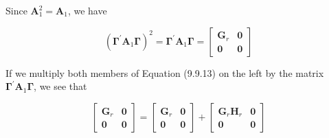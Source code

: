 Since $\boldsymbol{A}_{1}^{2}=\boldsymbol{A}_{1}$, we have

$$
\left(\boldsymbol{\Gamma}^{\prime} \boldsymbol{A}_{1} \boldsymbol{\Gamma}\right)^{2}=\boldsymbol{\Gamma}^{\prime} \boldsymbol{A}_{1} \boldsymbol{\Gamma}=\left[\begin{array}{cc}
\boldsymbol{G}_{r} & \mathbf{0} \\
\mathbf{0} & \mathbf{0}
\end{array}\right]
$$

If we multiply both members of Equation (9.9.13) on the left by the matrix $\boldsymbol{\Gamma}^{\prime} \boldsymbol{A}_{1} \boldsymbol{\Gamma}$, we see that

$$
\left[\begin{array}{cc}
\boldsymbol{G}_{r} & \mathbf{0} \\
\mathbf{0} & \mathbf{0}
\end{array}\right]=\left[\begin{array}{cc}
\boldsymbol{G}_{r} & \mathbf{0} \\
\mathbf{0} & \mathbf{0}
\end{array}\right]+\left[\begin{array}{cc}
\boldsymbol{G}_{r} \boldsymbol{H}_{r} & \mathbf{0} \\
\mathbf{0} & \mathbf{0}
\end{array}\right]
$$

